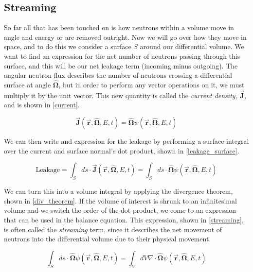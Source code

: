 \subsection{Streaming}

So far all that has been touched on is how neutrons within a volume move in angle and energy or are removed outright.  Now we will go over how they move in space, and to do this we consider a surface $S$ around our differential volume.  We want to find an expression for the net number of neutrons passing through this surface, and this will be our net leakage term (incoming minus outgoing).  The angular neutron flux describes the number of neutrons crossing a differential surface at angle $\boldsymbol{\hat{\Omega}}$, but in order to perform any vector operations on it, we must multiply it by the unit vector.  This new quantity is called the \emph{current density}, $\vec{\boldsymbol{J}}$, and is shown in \eqref{current}.

\begin{equation}
\label{current}
\vec{\boldsymbol{J}}(\boldsymbol{\vec{r}},\boldsymbol{\hat{\Omega}},E,t) =  \boldsymbol{\hat{\Omega}} \psi(\boldsymbol{\vec{r}},\boldsymbol{\hat{\Omega}},E,t)
\end{equation}

We can then write and expression for the leakage by performing a surface integral over the current and surface normal's dot product, shown in \eqref{leakage_surface}.

\begin{equation}
\label{leakage_surface}
\mathrm{Leakage} = \int_S ds \cdot  \vec{\boldsymbol{J}}(\boldsymbol{\vec{r}},\boldsymbol{\hat{\Omega}},E,t) = \int_S ds \cdot  \boldsymbol{\hat{\Omega}} \psi(\boldsymbol{\vec{r}},\boldsymbol{\hat{\Omega}},E,t)
\end{equation}
 
 We can turn this into a volume integral by applying the divergence theorem, shown in \eqref{div_theorem}.  If the volume of interest is shrunk to an infinitesimal volume and we switch the order of the dot product, we come to an expression that can be used in the balance equation.  This expression, shown in \eqref{streaming}, is often called the \emph{streaming} term, since it describes the net movement of neutrons into the differential volume due to their physical movement.
 
\begin{equation}
\label{div_theorem}
\int_S ds \cdot \boldsymbol{\hat{\Omega}} \psi(\boldsymbol{\vec{r}},\boldsymbol{\hat{\Omega}},E,t) = \int_V dV \nabla \cdot \boldsymbol{\hat{\Omega}}  \psi(\boldsymbol{\vec{r}},\boldsymbol{\hat{\Omega}},E,t)
\end{equation}

